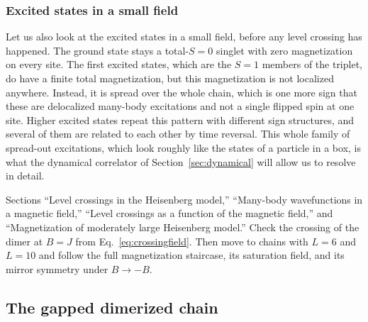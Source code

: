 \documentclass[lecture_notes.tex]{subfiles}
\begin{document}
\subsubsection{Excited states in a small field}
Let us also look at the excited states in a small field, before any level crossing has happened. The
ground state stays a total-$S=0$ singlet with zero magnetization on every site. The first excited
states, which are the $S=1$ members of the triplet, do have a finite total magnetization, but this
magnetization is not localized anywhere. Instead, it is spread over the whole chain, which is one
more sign that these are delocalized many-body excitations and not a single flipped spin at one
site. Higher excited states repeat this pattern with different sign structures, and several of them
are related to each other by time reversal. This whole family of spread-out excitations, which look
roughly like the states of a particle in a box, is what the dynamical correlator of
Section~\ref{sec:dynamical} will allow us to resolve in detail.

\begin{notebook}
Sections ``Level crossings in the Heisenberg model,'' ``Many-body wavefunctions in a magnetic
field,'' ``Level crossings as a function of the magnetic field,'' and ``Magnetization of moderately
large Heisenberg model.'' Check the crossing of the dimer at $B=J$ from Eq.~\eqref{eq:crossingfield}.
Then move to chains with $L=6$ and $L=10$ and follow the full magnetization staircase, its
saturation field, and its mirror symmetry under $B\to-B$.
\end{notebook}

\subsection{The gapped dimerized chain}
\label{sec:dimerization}
\end{document}

